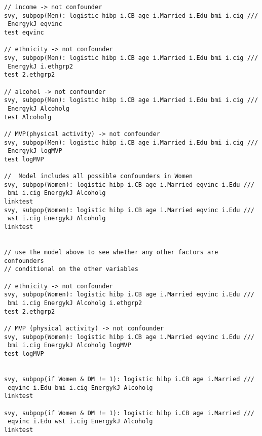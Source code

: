 \begin{verbatim}
// income -> not confounder
svy, subpop(Men): logistic hibp i.CB age i.Married i.Edu bmi i.cig /// 
 EnergykJ eqvinc
test eqvinc

// ethnicity -> not confounder
svy, subpop(Men): logistic hibp i.CB age i.Married i.Edu bmi i.cig /// 
 EnergykJ i.ethgrp2
test 2.ethgrp2

// alcohol -> not confounder
svy, subpop(Men): logistic hibp i.CB age i.Married i.Edu bmi i.cig /// 
 EnergykJ Alcoholg
test Alcoholg

// MVP(physical activity) -> not confounder
svy, subpop(Men): logistic hibp i.CB age i.Married i.Edu bmi i.cig /// 
 EnergykJ logMVP
test logMVP

//  Model includes all possible confounders in Women
svy, subpop(Women): logistic hibp i.CB age i.Married eqvinc i.Edu ///
 bmi i.cig EnergykJ Alcoholg 
linktest
svy, subpop(Women): logistic hibp i.CB age i.Married eqvinc i.Edu ///
 wst i.cig EnergykJ Alcoholg 
linktest


// use the model above to see whether any other factors are confounders 
// conditional on the other variables 

// ethnicity -> not confounder
svy, subpop(Women): logistic hibp i.CB age i.Married eqvinc i.Edu /// 
 bmi i.cig EnergykJ Alcoholg i.ethgrp2
test 2.ethgrp2

// MVP (physical activity) -> not confounder
svy, subpop(Women): logistic hibp i.CB age i.Married eqvinc i.Edu /// 
 bmi i.cig EnergykJ Alcoholg logMVP
test logMVP


svy, subpop(if Women & DM != 1): logistic hibp i.CB age i.Married /// 
 eqvinc i.Edu bmi i.cig EnergykJ Alcoholg
linktest

svy, subpop(if Women & DM != 1): logistic hibp i.CB age i.Married /// 
 eqvinc i.Edu wst i.cig EnergykJ Alcoholg
linktest
\end{verbatim}

